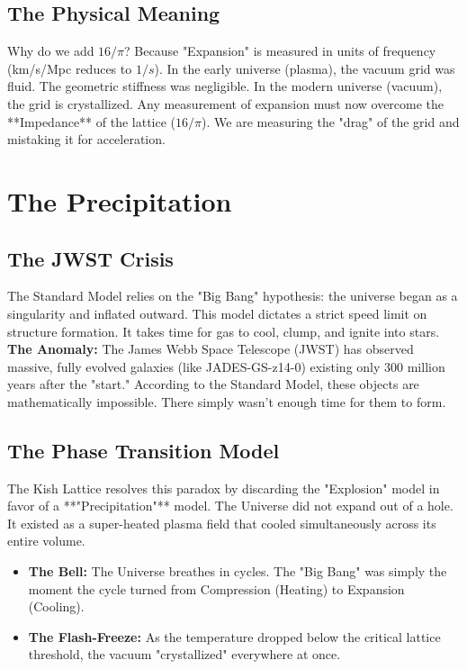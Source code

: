 \documentclass[11pt, letterpaper, openany]{book}
\begin{document}
\section{The Physical Meaning}
Why do we add $16/\pi$? 
Because "Expansion" is measured in units of frequency (km/s/Mpc reduces to $1/s$).
In the early universe (plasma), the vacuum grid was fluid. The geometric stiffness was negligible.
In the modern universe (vacuum), the grid is crystallized. Any measurement of expansion must now overcome the **Impedance** of the lattice ($16/\pi$). 
We are measuring the "drag" of the grid and mistaking it for acceleration.


\chapter{The Precipitation}
\label{chap:precipitation}

\section{The JWST Crisis}
The Standard Model relies on the "Big Bang" hypothesis: the universe began as a singularity and inflated outward.
This model dictates a strict speed limit on structure formation. It takes time for gas to cool, clump, and ignite into stars.
\textbf{The Anomaly:} The James Webb Space Telescope (JWST) has observed massive, fully evolved galaxies (like JADES-GS-z14-0) existing only 300 million years after the "start."
According to the Standard Model, these objects are mathematically impossible. There simply wasn't enough time for them to form.

\section{The Phase Transition Model}
The Kish Lattice resolves this paradox by discarding the "Explosion" model in favor of a **"Precipitation"** model.
The Universe did not expand out of a hole. It existed as a super-heated plasma field that cooled simultaneously across its entire volume.
\begin{itemize}
    \item \textbf{The Bell:} The Universe breathes in cycles. The "Big Bang" was simply the moment the cycle turned from Compression (Heating) to Expansion (Cooling).
    \item \textbf{The Flash-Freeze:} As the temperature dropped below the critical lattice threshold, the vacuum "crystallized" everywhere at once.
\end{itemize}
\end{document}

